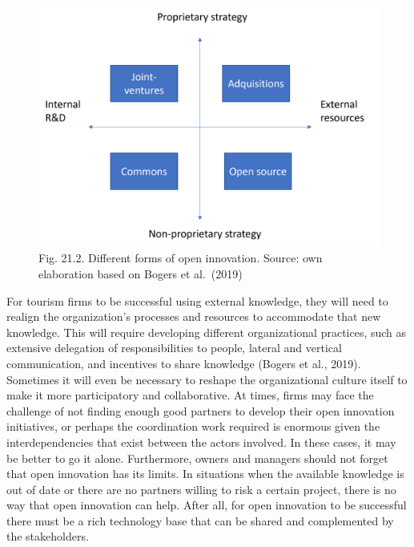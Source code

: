 \documentclass[
  letterpaper,
  DIV=11,
  numbers=noendperiod]{scrreprt}
\begin{document}
\begin{figure}

{\centering \includegraphics[width=6.25in,height=\textheight]{img/fig34.png}

}

\caption{Fig. 21.2. Different forms of open innovation. Source: own
elaboration based on Bogers et al.~(2019)}

\end{figure}

For tourism firms to be successful using external knowledge, they will
need to realign the organization's processes and resources to
accommodate that new knowledge. This will require developing different
organizational practices, such as extensive delegation of
responsibilities to people, lateral and vertical communication, and
incentives to share knowledge (Bogers et al., 2019). Sometimes it will
even be necessary to reshape the organizational culture itself to make
it more participatory and collaborative. At times, firms may face the
challenge of not finding enough good partners to develop their open
innovation initiatives, or perhaps the coordination work required is
enormous given the interdependencies that exist between the actors
involved. In these cases, it may be better to go it alone. Furthermore,
owners and managers should not forget that open innovation has its
limits. In situations when the available knowledge is out of date or
there are no partners willing to risk a certain project, there is no way
that open innovation can help. After all, for open innovation to be
successful there must be a rich technology base that can be shared and
complemented by the stakeholders.
\end{document}
